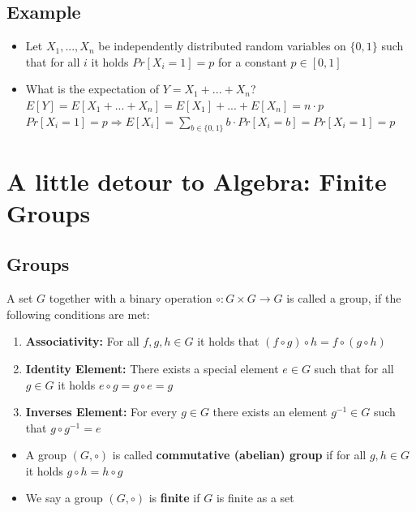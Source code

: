 		\subsection{Example}
			\begin{itemize}
				\item Let $X_1,...,X_n$ be independently distributed random variables on $\{0,1\}$ such that for all $i$ it holds $Pr[X_i=1] = p$ for a constant $p \in [0,1]$
				\item What is the expectation of $Y = X_1+...+X_n$?\\
					$E[Y] = E[X_1+...+X_n] = E[X_1] +...+ E[X_n] = n \cdot p$\\
					$Pr[X_i = 1] = p \Rightarrow E[X_i] = \sum\limits_{b \in \{0,1\}} b \cdot Pr[X_i = b] = Pr[X_i = 1] = p$
			\end{itemize}

	\section{A little detour to Algebra: Finite Groups}
		\subsection{Groups}
			A set $G$ together with a binary operation $\circ: G \times G \to G$ is called a group, if the following conditions are met:
			\begin{enumerate}
				\item \textbf{Associativity:} 
				For all $f,g,h \in G$ it holds that $(f \circ g) \circ h = f \circ (g \circ h)$
				\item \textbf{Identity Element:} 
				There exists a special element $e \in G$ such that for all $g \in G$ it holds $e \circ g = g \circ e = g$
				\item \textbf{Inverses Element:}
				For every $g \in G$ there exists an element $g^{-1} \in G$ such that $g \circ g^{-1} = e$
			\end{enumerate}
			\begin{itemize}
				\item A group $(G,\circ)$ is called \textbf{commutative (abelian) group} if for all $g,h \in G$ it holds $g \circ h = h \circ g$
				\item We say a group $(G,\circ)$ is \textbf{finite} if $G$ is finite as a set
			\end{itemize}
		
